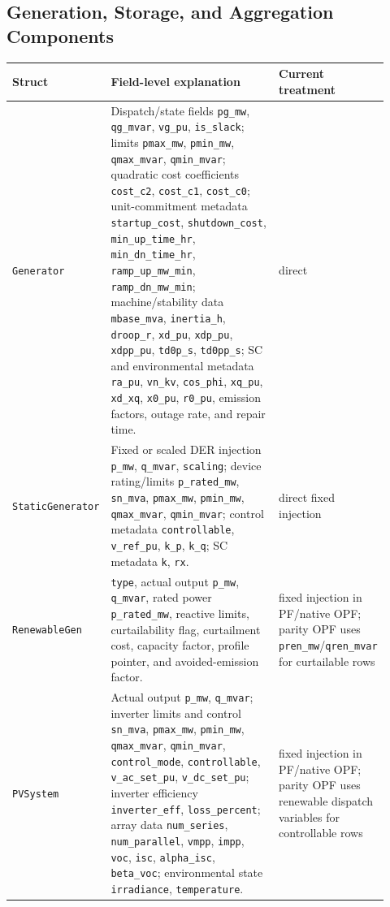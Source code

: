 \subsection{Generation, Storage, and Aggregation Components}

\begin{longtable}{L{0.20\linewidth}L{0.53\linewidth}L{0.19\linewidth}}
\toprule
Struct & Field-level explanation & Current treatment \\
\midrule
\endhead
\texttt{Generator} & Dispatch/state fields \texttt{pg\_mw}, \texttt{qg\_mvar}, \texttt{vg\_pu}, \texttt{is\_slack}; limits \texttt{pmax\_mw}, \texttt{pmin\_mw}, \texttt{qmax\_mvar}, \texttt{qmin\_mvar}; quadratic cost coefficients \texttt{cost\_c2}, \texttt{cost\_c1}, \texttt{cost\_c0}; unit-commitment metadata \texttt{startup\_cost}, \texttt{shutdown\_cost}, \texttt{min\_up\_time\_hr}, \texttt{min\_dn\_time\_hr}, \texttt{ramp\_up\_mw\_min}, \texttt{ramp\_dn\_mw\_min}; machine/stability data \texttt{mbase\_mva}, \texttt{inertia\_h}, \texttt{droop\_r}, \texttt{xd\_pu}, \texttt{xdp\_pu}, \texttt{xdpp\_pu}, \texttt{td0p\_s}, \texttt{td0pp\_s}; SC and environmental metadata \texttt{ra\_pu}, \texttt{vn\_kv}, \texttt{cos\_phi}, \texttt{xq\_pu}, \texttt{xd\_xq}, \texttt{x0\_pu}, \texttt{r0\_pu}, emission factors, outage rate, and repair time. & direct \\
\texttt{StaticGenerator} & Fixed or scaled DER injection \texttt{p\_mw}, \texttt{q\_mvar}, \texttt{scaling}; device rating/limits \texttt{p\_rated\_mw}, \texttt{sn\_mva}, \texttt{pmax\_mw}, \texttt{pmin\_mw}, \texttt{qmax\_mvar}, \texttt{qmin\_mvar}; control metadata \texttt{controllable}, \texttt{v\_ref\_pu}, \texttt{k\_p}, \texttt{k\_q}; SC metadata \texttt{k}, \texttt{rx}. & direct fixed injection \\
\texttt{RenewableGen} & \texttt{type}, actual output \texttt{p\_mw}, \texttt{q\_mvar}, rated power \texttt{p\_rated\_mw}, reactive limits, curtailability flag, curtailment cost, capacity factor, profile pointer, and avoided-emission factor. & fixed injection in PF/native OPF; parity OPF uses \texttt{pren\_mw}/\texttt{qren\_mvar} for curtailable rows \\
\texttt{PVSystem} & Actual output \texttt{p\_mw}, \texttt{q\_mvar}; inverter limits and control \texttt{sn\_mva}, \texttt{pmax\_mw}, \texttt{pmin\_mw}, \texttt{qmax\_mvar}, \texttt{qmin\_mvar}, \texttt{control\_mode}, \texttt{controllable}, \texttt{v\_ac\_set\_pu}, \texttt{v\_dc\_set\_pu}; inverter efficiency \texttt{inverter\_eff}, \texttt{loss\_percent}; array data \texttt{num\_series}, \texttt{num\_parallel}, \texttt{vmpp}, \texttt{impp}, \texttt{voc}, \texttt{isc}, \texttt{alpha\_isc}, \texttt{beta\_voc}; environmental state \texttt{irradiance}, \texttt{temperature}. & fixed injection in PF/native OPF; parity OPF uses renewable dispatch variables for controllable rows \\

\end{longtable}
